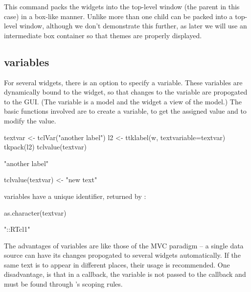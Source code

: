 This command packs the widgets into the top-level window (the parent
in this case) in a box-like manner. Unlike \GTK\/ more than one child
can be packed into a top-level window, although we don't demonstrate
this further, as later we will use an intermediate 
box container so that themes are properly displayed.

\subsection{\TCL\/ variables}
\label{sec:tcltk:overview:textvariables}


For several \TK\/ widgets, there is an option  to specify
a \TCL\/ variable. These variables are dynamically bound to the
widget, so that changes to the variable are propogated to the
GUI. (The \TCL\/ variable is a model and the widget a view of the
model.)  The basic functions involved are  to create
a \TCL\/ variable,  to get the assigned value and
 to modify the value.

\begin{Schunk}
\begin{Sinput}
 textvar <- tclVar("another label")
 l2 <- ttklabel(w, textvariable=textvar)
 tkpack(l2)
 tclvalue(textvar)
\end{Sinput}
\begin{Soutput}
[1] "another label"
\end{Soutput}
\begin{Sinput}
 tclvalue(textvar) <- "new text"         
\end{Sinput}
\end{Schunk}

\TCL\/ variables have a unique identifier, returned by :
\begin{Schunk}
\begin{Sinput}
 as.character(textvar)
\end{Sinput}
\begin{Soutput}
[1] "::RTcl1"
\end{Soutput}
\end{Schunk}

The advantages of \TCL\/ variables are like those of the MVC paradigm
-- a single data source can have its changes propogated to several
widgets automatically. If the same text is to appear in different
places, their usage is recommended.  One disadvantage, is that in a
callback, the variable is not passed to the callback and must be found
through \R's scoping rules.

